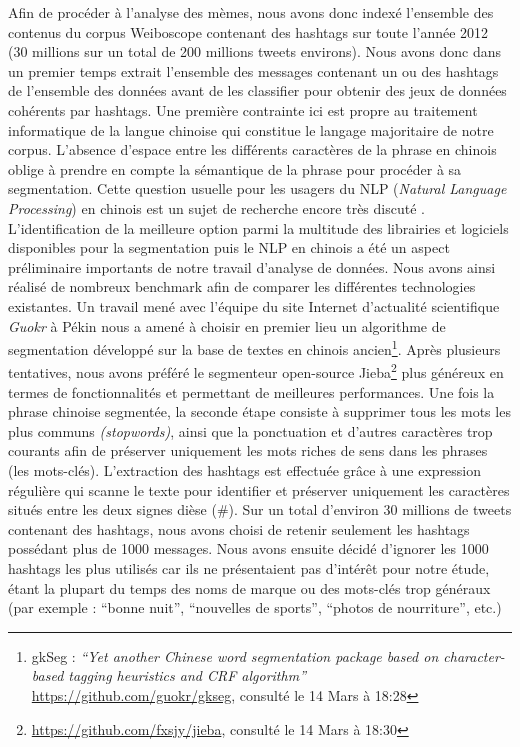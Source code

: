 Afin de proc\'eder \`a l{\textquoteright}analyse des m\`emes, nous avons
donc index\'e l{\textquoteright}ensemble des contenus du corpus
Weiboscope contenant des hashtags sur toute l{\textquoteright}ann\'ee
2012 (30 millions sur un total de 200 millions tweets environs). Nous
avons donc dans un premier temps extrait l{\textquoteright}ensemble des
messages contenant un ou des hashtags de l{\textquoteright}ensemble des
donn\'ees avant de les classifier pour obtenir des jeux de donn\'ees
coh\'erents par hashtags. Une premi\`ere contrainte ici est propre au
traitement informatique de la langue chinoise qui constitue le langage
majoritaire de notre corpus. L{\textquoteright}absence
d{\textquoteright}espace entre les diff\'erents caract\`eres de la
phrase en chinois oblige \`a prendre en compte la s\'emantique de la
phrase pour proc\'eder \`a sa segmentation. Cette question usuelle pour
les usagers du NLP (\textit{Natural Language Processing}) en chinois
est un sujet de recherche encore tr\`es discut\'e \citep{Qiu2013}.
L{\textquoteright}identification de la meilleure option parmi la
multitude des librairies et logiciels disponibles pour la segmentation
puis le NLP en chinois a \'et\'e un aspect pr\'eliminaire importants de
notre travail d{\textquoteright}analyse de donn\'ees. Nous avons ainsi
r\'ealis\'e de nombreux benchmark afin de comparer les diff\'erentes
technologies existantes. Un travail men\'e avec
l{\textquoteright}\'equipe du site Internet
d{\textquoteright}actualit\'e scientifique \textit{Guokr }\`a P\'ekin
nous a amen\'e \`a choisir en premier lieu un algorithme de
segmentation d\'evelopp\'e sur la base de textes en chinois
ancien\footnote{ gkSeg : \textit{{\textquotedblleft}Yet another Chinese
word segmentation package based on character-based tagging heuristics
and CRF algorithm{\textquotedblright}
}\url{https://github.com/guokr/gkseg}, consult\'e le 14 Mars \`a
18:28}. Apr\`es plusieurs tentatives, nous avons pr\'ef\'er\'e le
segmenteur open-source Jieba\footnote{
\url{https://github.com/fxsjy/jieba}, consult\'e le 14 Mars \`a 18:30}
plus g\'en\'ereux en termes de fonctionnalit\'es et permettant de
meilleures performances. Une fois la phrase chinoise segment\'ee, la
seconde \'etape consiste \`a supprimer tous les mots les plus communs
\textit{(stopwords)}, ainsi que la ponctuation et
d{\textquoteright}autres caract\`eres trop courants afin de pr\'eserver
uniquement les mots riches de sens dans les phrases (les mots-cl\'es).
L{\textquoteright}extraction des hashtags est effectu\'ee gr\^ace \`a
une expression r\'eguli\`ere qui scanne le texte pour identifier et
pr\'eserver uniquement les caract\`eres situ\'es entre les deux signes
di\`ese (\#). Sur un total d{\textquoteright}environ 30 millions de
tweets contenant des hashtags, nous avons choisi de retenir seulement
les hashtags poss\'edant plus de 1000 messages. Nous avons ensuite
d\'ecid\'e d{\textquoteright}ignorer les 1000 hashtags les plus
utilis\'es car ils ne pr\'esentaient pas d{\textquoteright}int\'er\^et
pour notre \'etude, \'etant la plupart du temps des noms de marque ou
des mots-cl\'es trop g\'en\'eraux (par exemple :
{\textquotedblleft}bonne nuit{\textquotedblright},
{\textquotedblleft}nouvelles de sports{\textquotedblright},
{\textquotedblleft}photos de nourriture{\textquotedblright}, etc.) 


